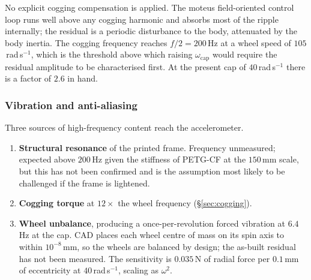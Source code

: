 No explicit cogging compensation is applied. The moteus field-oriented
control loop runs well above any cogging harmonic and absorbs most of the
ripple internally; the residual is a periodic disturbance to the body,
attenuated by the body inertia. The cogging frequency reaches
$f/2 = 200$\,Hz at a wheel speed of $105$\,rad\,s$^{-1}$, which is the
threshold above which raising $\omega_{\mathrm{cap}}$ would require the
residual amplitude to be characterised first. At the present cap of
$40$\,rad\,s$^{-1}$ there is a factor of $2.6$ in hand.

\subsubsection{Vibration and anti-aliasing}
\label{sec:vibration}

Three sources of high-frequency content reach the accelerometer.

\begin{enumerate}
  \item \textbf{Structural resonance} of the printed frame. Frequency
        unmeasured; expected above $200$\,Hz given the stiffness of PETG-CF
        at the $150$\,mm scale, but this has not been confirmed and is the
        assumption most likely to be challenged if the frame is lightened.
  \item \textbf{Cogging torque} at $12\times$ the wheel frequency
        (\S\ref{sec:cogging}).
  \item \textbf{Wheel unbalance}, producing a once-per-revolution forced
        vibration at $6.4$\,Hz at the cap. CAD places each wheel centre of
        mass on its spin axis to within $10^{-8}$\,mm, so the wheels are
        balanced by design; the as-built residual has not been measured. The
        sensitivity is $0.035$\,N of radial force per $0.1$\,mm of
        eccentricity at $40$\,rad\,s$^{-1}$, scaling as $\omega^2$.
\end{enumerate}

